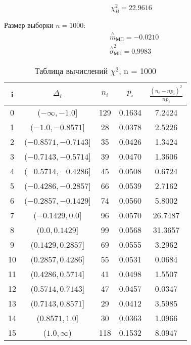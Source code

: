 \documentclass[a4]{article}
\begin{document}
$$\chi_B^2 = 22.9616$$ 

Размер выборки $n = 1000$:
  \begin{equation}
  \begin{split}
  &\overset{\wedge}{m}_{\text{МП}} =-0.0210\\
  &  \overset{\wedge}{\sigma}^2_{\text{МП}} = 0.9983
  \end{split}
  \end{equation}

\begin{table}[H]
	\caption{Таблица вычислений $\chi^2$, n = 1000}
	\label{tab:my_label1}
	\begin{center}
		\vspace{5mm}
		\begin{tabular}{|c|c|c|c|c|}
			\hline
			i & $\Delta_i$ & $n_i$ & $p_i$ & $\frac{(n_i-np_i)^2}{np_i}$\\ \hline
			0&  ($-\infty ,-1.0$]&  129&  0.1634&  7.2424\\ \hline
			1&  ($-1.0,-0.8571$]&  28&  0.0378&  2.5226\\ \hline
			2&  ($-0.8571,-0.7143$]&  35&  0.0426&  1.3424\\ \hline
			3&  ($-0.7143,-0.5714$]&  39&  0.0470&  1.3606\\ \hline
			4&  ($-0.5714,-0.4286$]&  45&  0.0508&  0.6724\\ \hline
			5&  ($-0.4286,-0.2857$]&  66&  0.0539&  2.7162\\ \hline
			6&  ($-0.2857,-0.1429$]&  74&  0.0560&  5.8002\\ \hline
			7&  ($-0.1429,0.0$]&  96&  0.0570&  26.7487\\ \hline
			8&  ($0.0,0.1429$]&  99&  0.0568&  31.3657\\ \hline
			9&  ($0.1429,0.2857$]&  69&  0.0555&  3.2962\\ \hline
			10&  ($0.2857,0.4286$]&  55&  0.0531&  0.0684\\ \hline
			11&  ($0.4286,0.5714$]&  41&  0.0498&  1.5507\\ \hline
			12&  ($0.5714,0.7143$]&  47&  0.0457&  0.0347\\ \hline
			13&  ($0.7143,0.8571$]&  29&  0.0412&  3.5985\\ \hline
			14&  ($0.8571,1.0$]&  30&  0.0363&  1.0966\\ \hline
			15&  ($ 1.0,\infty$)&  118&  0.1532&  8.0947\\ \hline
		\end{tabular}
	\end{center}
\end{table}
\end{document}
